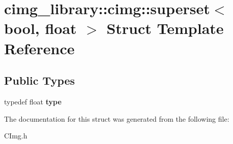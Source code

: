 \hypertarget{structcimg__library_1_1cimg_1_1superset_3_01bool_00_01float_01_4}{\section{cimg\-\_\-library\-:\-:cimg\-:\-:superset$<$ bool, float $>$ Struct Template Reference}
\label{structcimg__library_1_1cimg_1_1superset_3_01bool_00_01float_01_4}
}
\subsection*{Public Types}
\begin{DoxyCompactItemize}
\item 
\hypertarget{structcimg__library_1_1cimg_1_1superset_3_01bool_00_01float_01_4_a47b620709210e4310cde0abd7d569758}{typedef float {\bfseries type}}\label{structcimg__library_1_1cimg_1_1superset_3_01bool_00_01float_01_4_a47b620709210e4310cde0abd7d569758}

\end{DoxyCompactItemize}


The documentation for this struct was generated from the following file\-:\begin{DoxyCompactItemize}
\item 
C\-Img.\-h\end{DoxyCompactItemize}
